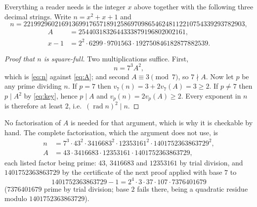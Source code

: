 \documentclass[11pt]{amsart}
\theoremstyle{remark}
\DeclareMathOperator{\rad}{rad}
\newcommand{\vp}{v}
\begin{document}
Everything a reader needs is the integer $x$ above together with the following
three decimal strings. Write $n=x^2+x+1$ and
{\small
\begin{equation}\label{eq:n}
 n=2219929602169136991765718912586970986546248112210754339293782903,
\end{equation}}
\begin{align}
 A&=2544031832644333879196802002161, \label{eq:A}\\
 x-1&=2^2\cdot 6299\cdot 9701563\cdot 192750846182877882539. \label{eq:xm1}
\end{align}

\begin{proof}[Proof that $n$ is square-full]
Two multiplications suffice. First,
\begin{equation}\label{eq:key}
 n=7^3A^2,
\end{equation}
which is \eqref{eq:n} against \eqref{eq:A}; and second $A\equiv 3\pmod 7$, so
$7\nmid A$. Now let $p$ be any prime dividing $n$. If $p=7$ then
$\vp_7(n)=3+2\vp_7(A)=3\ge2$. If $p\neq7$ then $p\mid A^2$ by \eqref{eq:key},
hence $p\mid A$ and $\vp_p(n)=2\vp_p(A)\ge2$. Every exponent in $n$ is therefore
at least $2$, i.e.\ $(\rad n)^2\mid n$.
\end{proof}

No factorisation of $A$ is needed for that argument, which is why it is
checkable by hand. The complete factorisation, which the argument does not use,
is
\begin{equation}\label{eq:full}
\begin{aligned}
 n&=7^3\cdot 43^2\cdot 3416683^2\cdot 12353161^2\cdot 1401752363863729^2,\\
 A&=43\cdot 3416683\cdot 12353161\cdot 1401752363863729 ,
\end{aligned}
\end{equation}
each listed factor being prime: $43$, $3416683$ and $12353161$ by trial
division, and $1401752363863729$ by the certificate of the next proof applied
with base $7$ to
\[
 1401752363863729-1=2^4\cdot3\cdot37\cdot107\cdot7376401679
\]
($7376401679$ prime by trial division; base $2$ fails there, being a quadratic
residue modulo $1401752363863729$).
\end{document}
